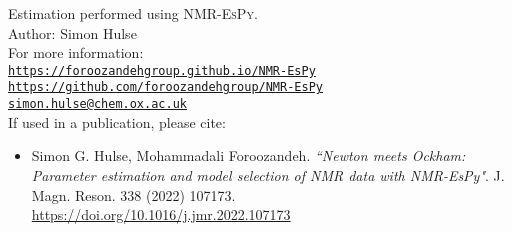 \documentclass[8pt]{article}
\begin{document}
\small
\begin{tcolorbox}[hbox]
\begin{varwidth}{12cm}
Estimation performed using \textsc{NMR-EsPy}.\\
Author: Simon Hulse\\
For more information:\\[5pt]
{}\hspace{1em}\href{https://foroozandehgroup.github.io/NMR-EsPy}{\texttt{https://foroozandehgroup.github.io/NMR-EsPy}}\\[5pt]
{}\hspace{1em}\href{https://github.com/foroozandehgroup/NMR-EsPy}{\texttt{https://github.com/foroozandehgroup/NMR-EsPy}}\\[5pt]
{}\hspace{1em}\href{mailto:simon.hulse@chem.ox.ac.uk?subject=NMR-EsPy query}{\texttt{simon.hulse@chem.ox.ac.uk}}\\[5pt]
If used in a publication, please cite:\\
\begin{itemize}[leftmargin=*, nosep, label={}]
\item Simon G. Hulse, Mohammadali Foroozandeh. \textit{``Newton meets Ockham: Parameter estimation and model selection of NMR data with NMR-EsPy"}. J. Magn. Reson. 338 (2022) 107173.\\ \href{https://doi.org/10.1016/j.jmr.2022.107173}{https://doi.org/10.1016/j.jmr.2022.107173}
\end{itemize}
\end{varwidth}
\end{tcolorbox}
\end{document}
